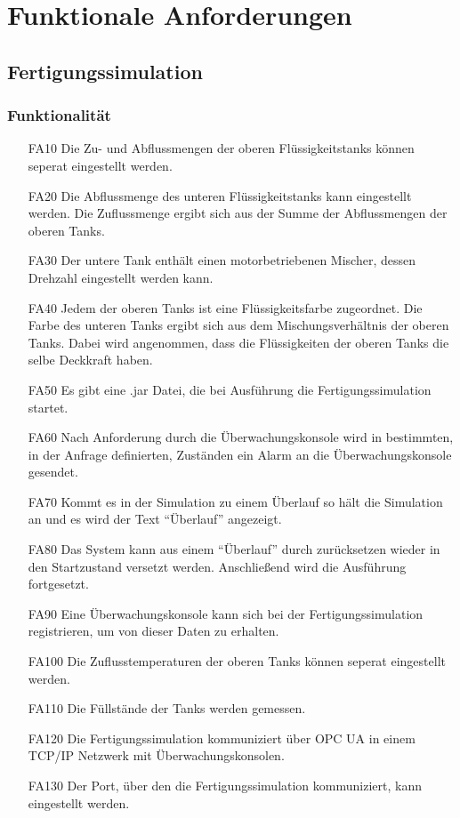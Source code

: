 \documentclass[parskip=full]{scrartcl}
\begin{document}
\section{Funktionale Anforderungen}
\subsection{Fertigungssimulation}
\subsubsection{Funktionalität}
\begin{enumerate}
\item[FA10] Die Zu- und Abflussmengen der oberen Flüssigkeitstanks können seperat eingestellt werden.
\item[FA20] Die Abflussmenge des unteren Flüssigkeitstanks kann eingestellt werden. Die Zuflussmenge ergibt sich aus der Summe der Abflussmengen der oberen Tanks.
\item[FA30] Der untere Tank enthält einen motorbetriebenen Mischer, dessen Drehzahl eingestellt werden kann.
\item[FA40] Jedem der oberen Tanks ist eine Flüssigkeitsfarbe zugeordnet. Die Farbe des unteren Tanks ergibt sich aus dem Mischungsverhältnis der oberen Tanks. Dabei wird
  angenommen, dass die Flüssigkeiten der oberen Tanks die selbe Deckkraft haben.
\item[FA50] Es gibt eine .jar Datei, die bei Ausführung die Fertigungssimulation startet.
\item[FA60] Nach Anforderung durch die \"Uberwachungskonsole wird in bestimmten, in der Anfrage definierten, Zust\"anden ein Alarm an die \"Uberwachungskonsole gesendet.
\item[FA70] Kommt es in der Simulation zu einem \"Uberlauf so h\"alt die Simulation an und es wird der Text ``\"Uberlauf'' angezeigt.
\item[FA80] Das System kann aus einem ``\"Uberlauf'' durch zur\"ucksetzen wieder in den Startzustand versetzt werden. Anschlie{\ss}end wird die Ausführung fortgesetzt.
\item[FA90] Eine \"Uberwachungskonsole kann sich bei der Fertigungssimulation registrieren, um von dieser Daten zu erhalten.
\item[FA100] Die Zuflusstemperaturen der oberen Tanks können seperat eingestellt werden.
\item[FA110] Die Füllstände der Tanks werden gemessen.
\item[FA120] Die Fertigungssimulation kommuniziert über OPC UA in einem TCP/IP Netzwerk mit Überwachungskonsolen.
\item[FA130] Der Port, \"uber den die Fertigungssimulation kommuniziert, kann eingestellt werden.
\end{enumerate}
\end{document}
